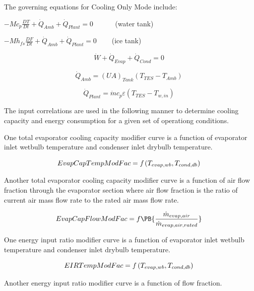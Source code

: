 The governing equations for Cooling Only Mode include:

\(- M{c_p}\frac{{DT}}{{Dt}} + {\dot Q_{Amb}} + {\dot Q_{Plant}} = 0\) ~~~~~ (water tank)

\(- M{h_{fs}}\frac{{DF}}{{Dt}} + {\dot Q_{Amb}} + {\dot Q_{Plant}} = 0\) ~~~ (ice tank)

\begin{equation}
\dot W + {\dot Q_{Evap}} + {\dot Q_{Cond}} = 0
\end{equation}

\begin{equation}
{\dot Q_{Amb}} = {\left( {UA} \right)_{Tank}}\left( {{T_{TES}} - {T_{Amb}}} \right)
\end{equation}

\begin{equation}
{\dot Q_{Plant}} = \dot m{c_p}\varepsilon \left( {{T_{TES}} - {T_{w,in}}} \right)
\end{equation}

The input correlations are used in the following manner to determine cooling capacity and energy consumption for a given set of operationg conditions.

One total evaporator cooling capacity modifier curve is a function of evaporator inlet wetbulb temperature and condenser inlet drybulb temperature.

\begin{equation}
EvapCapTempModFac = {f_{}}\left( {{T_{evap,wb}},{\rm{}}{T_{cond,db}}} \right)
\end{equation}

Another total evaporator cooling capacity modifier curve is a function of air flow fraction through the evaporator section where air flow fraction is the ratio of current air mass flow rate to the rated air mass flow rate.

\begin{equation}
  EvapCapFlowModFac = f\PB{\frac{\dot{m}_{evap,air}}{\dot{m}_{evap,air,rated}}}
\end{equation}

One energy input ratio modifier curve is a function of evaporator inlet wetbulb temperature and condenser inlet drybulb temperature.

\begin{equation}
EIRTempModFac = f\left( {{T_{evap,wb}},{\rm{}}{T_{cond,db}}} \right)
\end{equation}

Another energy input ratio modifier curve is a function of flow fraction.

